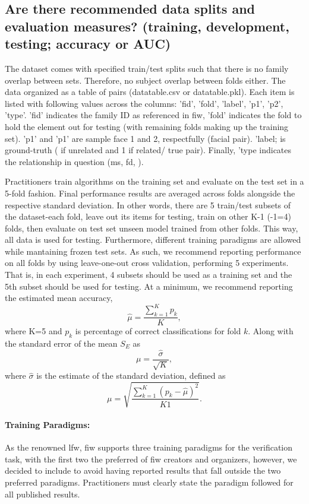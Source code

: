 \subsection*{Are there recommended data splits and evaluation measures? (\eg training, development, testing; accuracy or AUC)}
\noindent The dataset comes with specified train/test splits such that there is no family overlap between sets. Therefore, no subject overlap between folds either. The data organized as a table of pairs (datatable.csv or datatable.pkl). Each item is listed with following values across the columns: 'fid', 'fold', 'label', 'p1', 'p2', 'type'. 'fid' indicates the family ID as referenced in \gls{fiw}, 'fold' indicates the fold to hold the element out for testing (\ie with remaining folds making up the training set). 'p1' and 'p1' are sample face 1 and 2, respectfully (\ie facial pair). 'label; is ground-truth ( if unrelated and 1 if related/ true pair). Finally, 'type indicates the relationship in question (\eg \gls{ms}, \gls{fd}, \etc).

Practitioners train algorithms on the training set and evaluate on the test set in a 5-fold fashion. Final
performance results are averaged across folds alongside the respective standard deviation.
In other words, there are 5 train/test subsets of the dataset-each fold, leave out its items for testing, train on other K-1 (-1=4) folds, then evaluate on test set unseen \wrt model trained from other folds. This way, all data is used for testing. Furthermore, different training paradigms are allowed while mantaining frozen test sets. As such, we recommend reporting performance on all folds by using leave-one-out cross validation, performing 5 experiments. That is, in each experiment, 4 subsets should be used as a training set and the 5th subset should be used for testing. At a minimum, we recommend reporting the estimated mean accuracy, $$\hat\mu=\frac{\sum^K_{k=1}p_k}{K},$$ where K=5 and $p_k$ is percentage of correct classifications for fold $k$. Along with the standard error of the mean $S_E$ as
$$
\mu=\frac{\hat\sigma}{\sqrt{K}},
$$
where $\hat\sigma$ is the estimate of the standard deviation, defined as
$$
\mu=\sqrt{\frac{\sum^K_{k=1}(p_k-\hat\mu)^2}{K 1}}.$$

\paragraph{Training Paradigms:} As the renowned \gls{lfw}, \gls{fiw} supports three training paradigms for the verification task, with the first two the preferred of \gls{fiw} creators and organizers, however, we decided to include to avoid having reported results that fall outside the two preferred paradigms. Practitioners must clearly state the paradigm followed for all published results.

